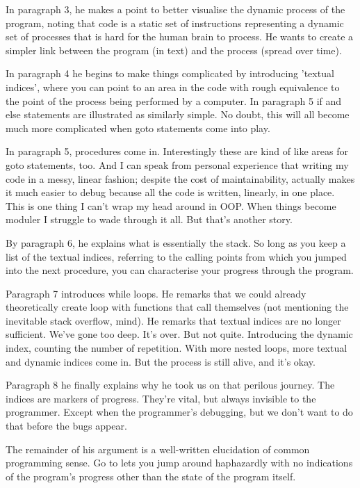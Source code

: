 \documentclass{journal}
\begin{document}
In paragraph 3, he makes a point to better visualise the dynamic process of the program, noting that code is a static set of instructions representing a dynamic set of processes that is hard for the human brain to process. He wants to create a simpler link between the program (in text) and the process (spread over time).

In paragraph 4 he begins to make things complicated by introducing 'textual indices', where you can point to an area in the code with rough equivalence to the point of the process being performed by a computer. In paragraph 5 if and else statements are illustrated as similarly simple. No doubt, this will all become much more complicated when goto statements come into play.

In paragraph 5, procedures come in. Interestingly these are kind of like areas for goto statements, too. And I can speak from personal experience that writing my code in a messy, linear fashion; despite the cost of maintainability, actually makes it much easier to debug because all the code is written, linearly, in one place. This is one thing I can't wrap my head around in OOP. When things become moduler I struggle to wade through it all. But that's another story.

By paragraph 6, he explains what is essentially the stack. So long as you keep a list of the textual indices, referring to the calling points from which you jumped into the next procedure, you can characterise your progress through the program.

Paragraph 7 introduces while loops. He remarks that we could already theoretically create loop with functions that call themselves (not mentioning the inevitable stack overflow, mind). He remarks that textual indices are no longer sufficient. We've gone too deep. It's over. But not quite. Introducing the dynamic index, counting the number of repetition. With more nested loops, more textual and dynamic indices come in. But the process is still alive, and it's okay.

Paragraph 8 he finally explains why he took us on that perilous journey. The indices are markers of progress. They're vital, but always invisible to the programmer. Except when the programmer's debugging, but we don't want to do that before the bugs appear.

The remainder of his argument is a well-written elucidation of common programming sense. Go to lets you jump around haphazardly with no indications of the program's progress other than the state of the program itself. 
\end{document}
